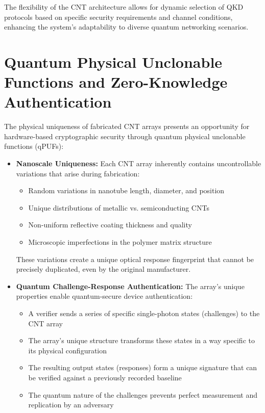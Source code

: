 \documentclass[11pt]{article}
\begin{document}
	The flexibility of the CNT architecture allows for dynamic selection of QKD protocols based on specific security requirements and channel conditions, enhancing the system's adaptability to diverse quantum networking scenarios.
	
	\section{Quantum Physical Unclonable Functions and Zero-Knowledge Authentication}
	The physical uniqueness of fabricated CNT arrays presents an opportunity for hardware-based cryptographic security through quantum physical unclonable functions (qPUFs):
	
	\begin{itemize}
		\item \textbf{Nanoscale Uniqueness:} Each CNT array inherently contains uncontrollable variations that arise during fabrication:
		\begin{itemize}
			\item Random variations in nanotube length, diameter, and position
			\item Unique distributions of metallic vs. semiconducting CNTs
			\item Non-uniform reflective coating thickness and quality
			\item Microscopic imperfections in the polymer matrix structure
		\end{itemize}
		These variations create a unique optical response fingerprint that cannot be precisely duplicated, even by the original manufacturer.
		
		\item \textbf{Quantum Challenge-Response Authentication:} The array's unique properties enable quantum-secure device authentication:
		\begin{itemize}
			\item A verifier sends a series of specific single-photon states (challenges) to the CNT array
			\item The array's unique structure transforms these states in a way specific to its physical configuration
			\item The resulting output states (responses) form a unique signature that can be verified against a previously recorded baseline
			\item The quantum nature of the challenges prevents perfect measurement and replication by an adversary
		\end{itemize}
		

\end{itemize}
\end{document}
